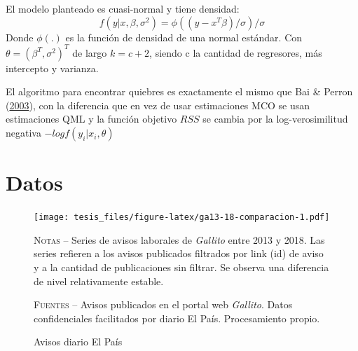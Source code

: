 \documentclass[12pt,oneside]{reedthesis}
\begin{document}
El modelo planteado es cuasi-normal y tiene densidad:
\[
f(y|x,\beta, \sigma^2) = \phi((y-x^T\beta)/\sigma)/\sigma
\]
Donde \(\phi(.)\) es la función de densidad de una normal estándar. Con \(\theta = (\beta^T, \sigma^2)^T\) de largo \(k = c +2\), siendo c la cantidad de regresores, más intercepto y varianza.

El algoritmo para encontrar quiebres es exactamente el mismo que Bai \& Perron (\protect\hyperlink{ref-BaiPerron2003}{2003}), con la diferencia que en vez de usar estimaciones MCO se usan estimaciones QML y la función objetivo \(RSS\) se cambia por la log-verosimilitud negativa \(-logf(y_i|x_i, \theta)\)

\newpage

\hypertarget{datos}{%
\section{Datos}\label{datos}}
\begin{figure}
\texttt{[image: tesis\_files/figure-latex/ga13-18-comparacion-1.pdf]}
\caption{Avisos diario El País}\label{fig:ga13-18-comparacion}\textsc{}

\footnotesize\textsc{Notas} -- Series de avisos laborales de \textit{Gallito} entre 2013 y 2018. Las series refieren a los avisos publicados filtrados por link (id) de aviso y a la cantidad de publicaciones sin filtrar. Se observa una diferencia de nivel relativamente estable.

\textsc{Fuentes} -- Avisos publicados en el portal web \textit{Gallito}. Datos confidenciales facilitados por diario El País. Procesamiento propio.
\end{figure}
\end{document}

